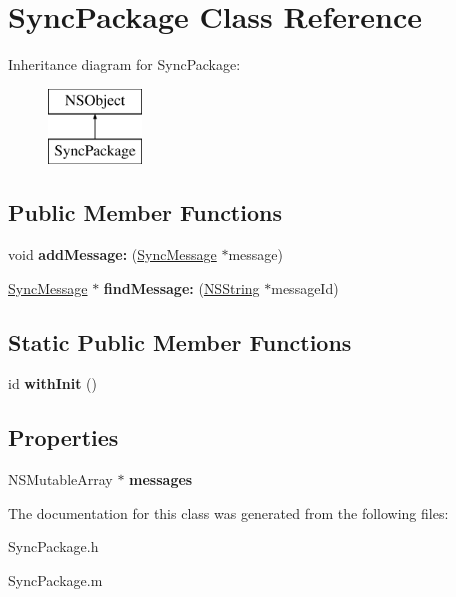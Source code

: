 \hypertarget{interface_sync_package}{
\section{\-Sync\-Package \-Class \-Reference}
\label{interface_sync_package}
}
\-Inheritance diagram for \-Sync\-Package\-:\begin{figure}[H]
\begin{center}
\leavevmode
\includegraphics[height=2.000000cm]{interface_sync_package}
\end{center}
\end{figure}
\subsection*{\-Public \-Member \-Functions}
\begin{DoxyCompactItemize}
\item 
\hypertarget{interface_sync_package_a56b6e60316327d8101c3c101a84f0f79}{
void {\bfseries add\-Message\-:} (\hyperlink{interface_sync_message}{\-Sync\-Message} $\ast$message)}
\label{interface_sync_package_a56b6e60316327d8101c3c101a84f0f79}

\item 
\hypertarget{interface_sync_package_ae1ce725c36c08f0ed50e62a9abe53666}{
\hyperlink{interface_sync_message}{\-Sync\-Message} $\ast$ {\bfseries find\-Message\-:} (\hyperlink{class_n_s_string}{\-N\-S\-String} $\ast$message\-Id)}
\label{interface_sync_package_ae1ce725c36c08f0ed50e62a9abe53666}

\end{DoxyCompactItemize}
\subsection*{\-Static \-Public \-Member \-Functions}
\begin{DoxyCompactItemize}
\item 
\hypertarget{interface_sync_package_aace2add7318eeac87c0bfff384dc508d}{
id {\bfseries with\-Init} ()}
\label{interface_sync_package_aace2add7318eeac87c0bfff384dc508d}

\end{DoxyCompactItemize}
\subsection*{\-Properties}
\begin{DoxyCompactItemize}
\item 
\hypertarget{interface_sync_package_abad6a6fc70f5fe4bdf8a4d60f0b36816}{
\-N\-S\-Mutable\-Array $\ast$ {\bfseries messages}}
\label{interface_sync_package_abad6a6fc70f5fe4bdf8a4d60f0b36816}

\end{DoxyCompactItemize}


\-The documentation for this class was generated from the following files\-:\begin{DoxyCompactItemize}
\item 
\-Sync\-Package.\-h\item 
\-Sync\-Package.\-m\end{DoxyCompactItemize}
